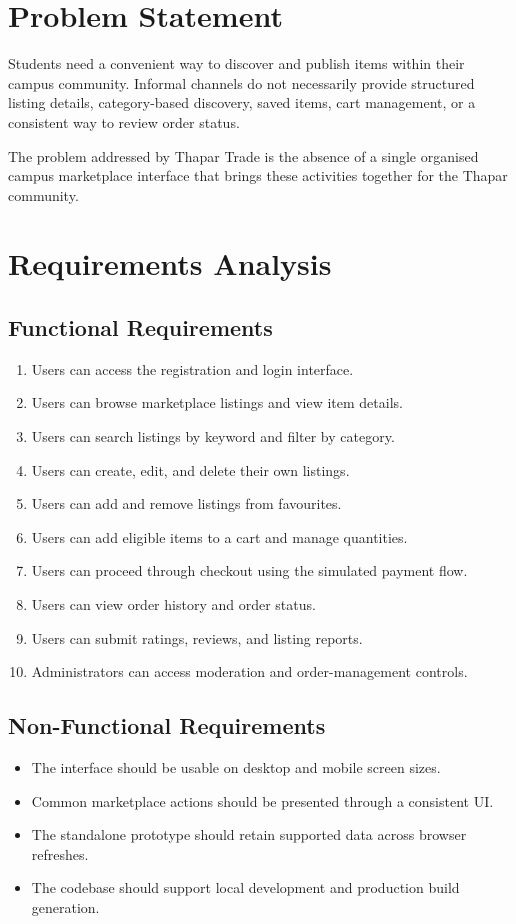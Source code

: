 \documentclass[12pt,a4paper]{report}
\begin{document}
\chapter{Problem Statement}
Students need a convenient way to discover and publish items within their campus
community. Informal channels do not necessarily provide structured listing
details, category-based discovery, saved items, cart management, or a consistent
way to review order status.

The problem addressed by Thapar Trade is the absence of a single organised
campus marketplace interface that brings these activities together for the
Thapar community.

\chapter{Requirements Analysis}
\section{Functional Requirements}
\begin{enumerate}
    \item Users can access the registration and login interface.
    \item Users can browse marketplace listings and view item details.
    \item Users can search listings by keyword and filter by category.
    \item Users can create, edit, and delete their own listings.
    \item Users can add and remove listings from favourites.
    \item Users can add eligible items to a cart and manage quantities.
    \item Users can proceed through checkout using the simulated payment flow.
    \item Users can view order history and order status.
    \item Users can submit ratings, reviews, and listing reports.
    \item Administrators can access moderation and order-management controls.
\end{enumerate}

\section{Non-Functional Requirements}
\begin{itemize}
    \item The interface should be usable on desktop and mobile screen sizes.
    \item Common marketplace actions should be presented through a consistent UI.
    \item The standalone prototype should retain supported data across browser refreshes.
    \item The codebase should support local development and production build generation.
\end{itemize}
\end{document}
